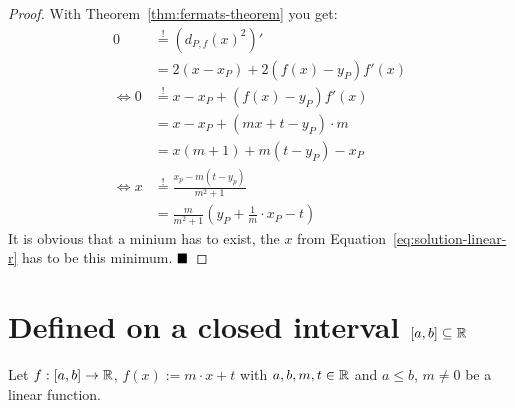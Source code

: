 \begin{proof}
    With Theorem~\ref{thm:fermats-theorem} you get:
    \begin{align}
        0 &\stackrel{!}{=} (d_{P,f}(x)^2)'\\
        &= 2(x-x_P) + 2 (f(x) - y_P)f'(x)\\
        \Leftrightarrow 0 &\stackrel{!}{=} x - x_P + (f(x) - y_P) f'(x)\\
        &= x- x_P + (mx+t - y_P)\cdot m\\
        &= x (m+1) + m(t-y_P) - x_P\\
        \Leftrightarrow x &\stackrel{!}{=} \frac{x_p - m(t-y_p)}{m^2+1}\\
        &= \frac{m}{m^2+1} \left ( y_P + \frac{1}{m} \cdot x_P - t \right )\label{eq:solution-linear-r}
    \end{align}
    It is obvious that a minium has to exist, the $x$ from Equation~\ref{eq:solution-linear-r}
    has to be this minimum. $\qed$
\end{proof}
\clearpage

\section{Defined on a closed interval $[a,b] \subseteq \mathbb{R}$}
Let $f:[a,b] \rightarrow \mathbb{R}$, $f(x) := m\cdot x + t$ with $a,b,m,t \in \mathbb{R}$ and 
$a \leq b$, $m \neq 0$  be a linear function.


